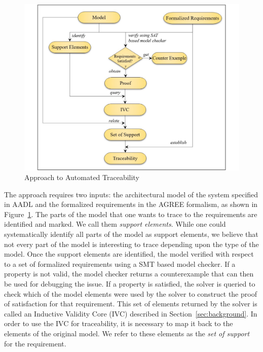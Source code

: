 \begin{figure}[htb]
\begin{center}
\includegraphics[width=\columnwidth]{images/approach.pdf}
\caption{Approach to Automated Traceability}\label{fig:approach}
\end{center}
\end{figure}

The approach requires two inputs: the architectural model of the system specified in AADL and the formalized requirements in the AGREE formalism, as shown in Figure~\ref{fig:approach}. The parts of the model that one wants to trace to the requirements are identified and marked. We call them \emph{support elements}. While one could systematically identify all parts of the model as support elements, we believe that not every part of the model is interesting to trace depending upon the type of the model. Once the support elements are identified, the model verified with respect to a set of formalized requirements using a SMT based model checker. If a property is not valid, the model checker returns a counterexample that can then be used for debugging the issue.  If a property is satisfied, the solver is queried to check which of the model elements were used by the solver to construct the proof of satisfaction for that requirement.  This set of elements returned by the solver is called an Inductive Validity Core (IVC) described in Section~\ref{sec:background}.  In order to use the IVC for traceability, it is necessary to map it back to the elements of the original model. We refer to these elements as the {\em set of support} for the requirement.

